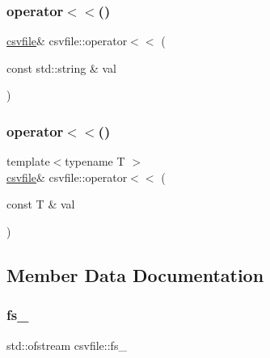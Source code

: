 \mbox{\label{classcsvfile_a3850513edbfe4b488cfd4a5bac2f15e6}} 
\subsubsection{\texorpdfstring{operator$<$$<$()}{operator<<()}\hspace{0.1cm}{\footnotesize\ttfamily [3/4]}}
{\footnotesize\ttfamily \hyperlink{classcsvfile}{csvfile}\& csvfile\+::operator$<$$<$ (\begin{DoxyParamCaption}\item[{const std\+::string \&}]{val }\end{DoxyParamCaption})\hspace{0.3cm}{\ttfamily [inline]}}

\mbox{\label{classcsvfile_ad00150e1310d31fd4f27801e52a3d7a5}} 
\subsubsection{\texorpdfstring{operator$<$$<$()}{operator<<()}\hspace{0.1cm}{\footnotesize\ttfamily [4/4]}}
{\footnotesize\ttfamily template$<$typename T $>$ \\
\hyperlink{classcsvfile}{csvfile}\& csvfile\+::operator$<$$<$ (\begin{DoxyParamCaption}\item[{const T \&}]{val }\end{DoxyParamCaption})\hspace{0.3cm}{\ttfamily [inline]}}



\subsection{Member Data Documentation}
\mbox{\label{classcsvfile_af9d64cb504548e6bca5e8bf283ae6b00}} 
\subsubsection{\texorpdfstring{fs\+\_\+}{fs\_}}
{\footnotesize\ttfamily std\+::ofstream csvfile\+::fs\+\_\+\hspace{0.3cm}{\ttfamily [private]}}

